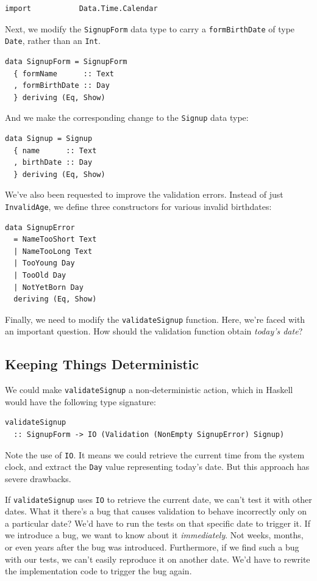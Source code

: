 \begin{verbatim}
import           Data.Time.Calendar
\end{verbatim}
Next, we modify the \texttt{SignupForm} data type to carry a
\texttt{formBirthDate} of type \texttt{Date}, rather than an
\texttt{Int}.

\begin{verbatim}
data SignupForm = SignupForm
  { formName      :: Text
  , formBirthDate :: Day
  } deriving (Eq, Show)
\end{verbatim}
And we make the corresponding change to the \texttt{Signup} data type:

\begin{verbatim}
data Signup = Signup
  { name      :: Text
  , birthDate :: Day
  } deriving (Eq, Show)
\end{verbatim}
We've also been requested to improve the validation errors. Instead of
just \texttt{InvalidAge}, we define three constructors for various
invalid birthdates:

\begin{verbatim}
data SignupError
  = NameTooShort Text
  | NameTooLong Text
  | TooYoung Day
  | TooOld Day
  | NotYetBorn Day
  deriving (Eq, Show)
\end{verbatim}
Finally, we need to modify the \texttt{validateSignup} function. Here,
we're faced with an important question. How should the validation
function obtain \emph{today's date}?

\subsection{Keeping Things
Deterministic}\label{keeping-things-deterministic}

We could make \texttt{validateSignup} a non-deterministic action, which
in Haskell would have the following type signature:

\begin{verbatim}
validateSignup
  :: SignupForm -> IO (Validation (NonEmpty SignupError) Signup)
\end{verbatim}
Note the use of \texttt{IO}. It means we could retrieve the current time
from the system clock, and extract the \texttt{Day} value representing
today's date. But this approach has severe drawbacks.

If \texttt{validateSignup} uses \texttt{IO} to retrieve the current
date, we can't test it with other dates. What it there's a bug that
causes validation to behave incorrectly only on a particular date? We'd
have to run the tests on that specific date to trigger it. If we
introduce a bug, we want to know about it \emph{immediately}. Not weeks,
months, or even years after the bug was introduced. Furthermore, if we
find such a bug with our tests, we can't easily reproduce it on another
date. We'd have to rewrite the implementation code to trigger the bug
again.

